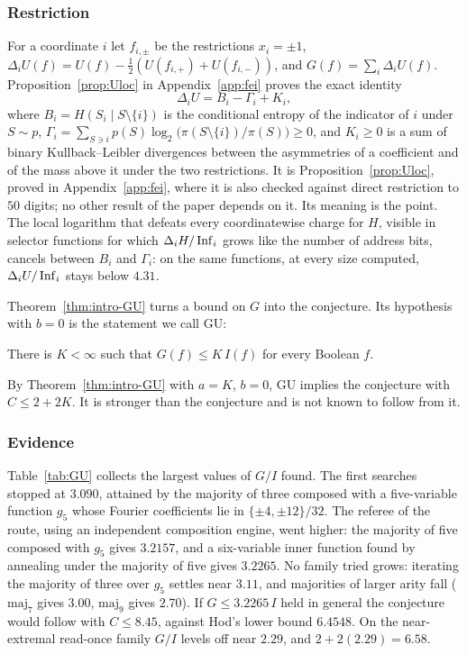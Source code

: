 \subsubsection*{Restriction}
For a coordinate $i$ let $f_{i,\pm}$ be the restrictions $x_i=\pm1$, $\Delta_iU(f)=U(f)-\frac12(U(f_{i,+})+U(f_{i,-}))$, and $G(f)=\sum_i\Delta_iU(f)$. Proposition~\ref{prop:Uloc} in Appendix~\ref{app:fei} proves the exact identity
\[
\Delta_iU=B_i-\Gamma_i+K_i,
\]
where $B_i=H(S_i\mid S\setminus\{i\})$ is the conditional entropy of the indicator of $i$ under $S\sim p$, $\Gamma_i=\sum_{S\ni i}p(S)\log_2\bigl(\pi(S\setminus\{i\})/\pi(S)\bigr)\ge0$, and $K_i\ge0$ is a sum of binary Kullback--Leibler divergences between the asymmetries of a coefficient and of the mass above it under the two restrictions. It is Proposition~\ref{prop:Uloc}, proved in Appendix~\ref{app:fei}, where it is also checked against direct restriction to $50$ digits; no other result of the paper depends on it. Its meaning is the point. The local logarithm that defeats every coordinatewise charge for $H$, visible in selector functions for which $\Delta_iH/\operatorname{Inf}_i$ grows like the number of address bits, cancels between $B_i$ and $\Gamma_i$: on the same functions, at every size computed, $\Delta_iU/\operatorname{Inf}_i$ stays below $4.31$.

Theorem~\ref{thm:intro-GU} turns a bound on $G$ into the conjecture. Its hypothesis with $b=0$ is the statement we call GU:
\begin{conjecture}[GU]\label{conj:GU}
There is $K<\infty$ such that $G(f)\le K\,I(f)$ for every Boolean $f$.
\end{conjecture}
By Theorem~\ref{thm:intro-GU} with $a=K$, $b=0$, GU implies the conjecture with $C\le2+2K$. It is stronger than the conjecture and is not known to follow from it.

\subsubsection*{Evidence}
Table~\ref{tab:GU} collects the largest values of $G/I$ found. The first searches stopped at $3.090$, attained by the majority of three composed with a five-variable function $g_5$ whose Fourier coefficients lie in $\{\pm4,\pm12\}/32$. The referee of the route, using an independent composition engine, went higher: the majority of five composed with $g_5$ gives $3.2157$, and a six-variable inner function found by annealing under the majority of five gives $3.2265$. No family tried grows: iterating the majority of three over $g_5$ settles near $3.11$, and majorities of larger arity fall ($\mathrm{maj}_7$ gives $3.00$, $\mathrm{maj}_9$ gives $2.70$). If $G\le3.2265\,I$ held in general the conjecture would follow with $C\le8.45$, against Hod's lower bound $6.4548$. On the near-extremal read-once family $G/I$ levels off near $2.29$, and $2+2(2.29)=6.58$.

